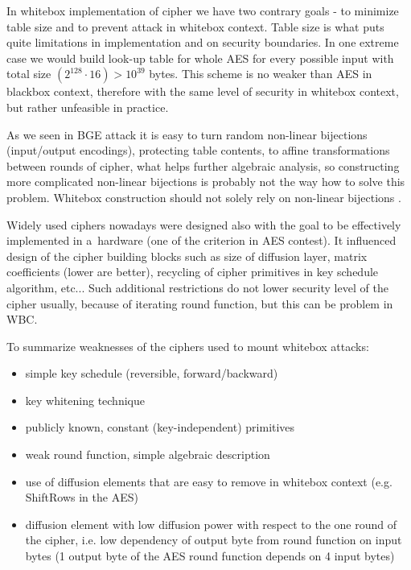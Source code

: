 \documentclass[11pt,oneside,final]{fithesis2}
\begin{document}
    In whitebox implementation of cipher we have two contrary goals - to minimize table size and to prevent attack in whitebox context. Table size is what puts quite limitations
    in implementation and on security boundaries. In one extreme case we would build look-up table for whole AES for every possible input with total size 
    $\left(2^{128} \cdot 16\right) > 10^{39}$ bytes. This 
    scheme is no weaker than AES in blackbox context, therefore with the same level of security in whitebox context, but rather unfeasible in practice.

    As we seen in BGE attack it is easy to turn random non-linear bijections (input/output encodings), protecting table contents, to affine transformations between rounds of
    cipher, what helps further algebraic analysis, so constructing more complicated non-linear bijections is probably not the way how to solve this problem. Whitebox construction
    should not solely rely on non-linear bijections \citep{Billet:2004:CWB:2080787.2080809, Michiels:2007:MST:1314276.1314291}.
    
    Widely used ciphers nowadays were designed also with the goal to be effectively implemented in a~hardware (one of the criterion in AES contest). 
    It influenced design of the cipher building blocks such as
    size of diffusion layer, matrix coefficients (lower are better), recycling of cipher primitives in key schedule algorithm, etc...
    Such additional restrictions do not lower security level of the cipher usually, because of iterating round function, but this can be problem in WBC.
    
    To summarize weaknesses of the ciphers used to mount whitebox attacks:
    \begin{itemize}
     \item simple key schedule (reversible, forward/backward)
     \item key whitening technique
     \item publicly known, constant (key-independent) primitives
     \item weak round function, simple algebraic description
     \item use of diffusion elements that are easy to remove in whitebox context (e.g. ShiftRows in the AES)
     \item diffusion element with low diffusion power with respect to the one round of the cipher, i.e. low dependency of 
	    output byte from round function on input bytes (1 output byte of the AES round function depends on 4 input bytes)
    \end{itemize}
    
\end{document}
